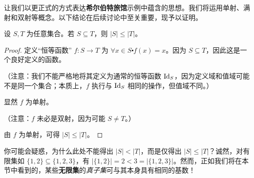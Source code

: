 让我们以更正式的方式表达\textbf{希尔伯特旅馆}示例中蕴含的思想。我们将运用单射、满射和双射等概念。以下结论在后续讨论中至关重要，现予以证明。

\begin{lemma}\label{lemma7.6.11}
    设 $S, T$ 为任意集合。若 $S \subseteq T$，则 $|S| \le |T|$。
\end{lemma}

\begin{proof}
    定义``恒等函数'' $f : S \to T$ 为 $\forall x \in S \centerdot f(x) = x$。因为 $S \subseteq T$，因此这是一个良好定义的函数。

    （注意：我们不能严格地将其定义为通常的恒等函数 $\text{Id}_S$，因为定义域和值域可能不是同一个集合；本质上，$f$ 执行与 $\text{Id}_S$ 相同的操作，但值域不同。）

    显然 $f$ 为单射。

    （注意：$f$ 未必是双射，因为可能 $S \ne T$。）

    由 $f$ 为单射，可得 $|S| \le |T|$。
\end{proof}

你可能会疑惑，为什么此处不能得出 $|S| < |T|$，而是仅得出 $|S| \le |T|$？诚然，对有限集如 $\{1, 2\} \subseteq \{1, 2, 3\}$，有 $|\{1, 2\}| = 2 < 3 = |\{1, 2, 3\}|$。然而，正如我们将在本节中看到的，某些\textbf{无限集}的\emph{真子集}可与其本身具有相同的基数！\\

